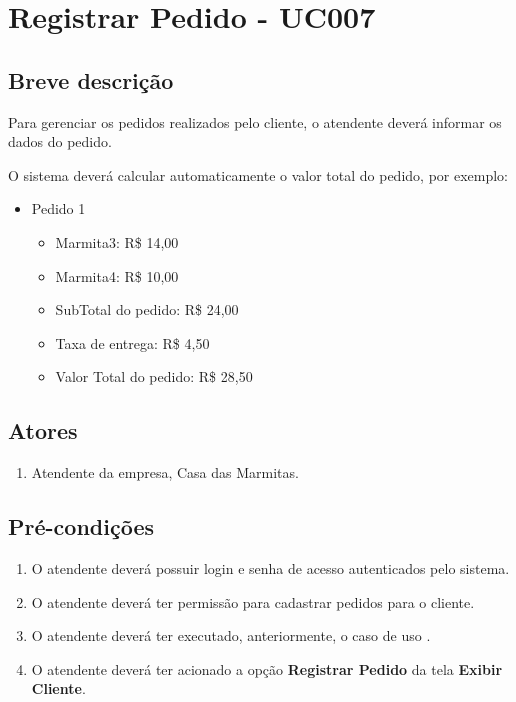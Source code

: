 \chapter{Registrar Pedido - UC007} \label{uc007}

\section{Breve descrição}

Para gerenciar os pedidos realizados pelo cliente, o atendente deverá informar os dados do pedido.

O sistema deverá calcular automaticamente o valor total do pedido, por exemplo:

\begin{itemize}
	\item Pedido 1
	\begin{itemize}
		\item Marmita3: R\$ 14,00
		\item Marmita4: R\$ 10,00
		\item SubTotal do pedido: R\$ 24,00
		\item Taxa de entrega: R\$ 4,50
		\item Valor Total do pedido: R\$ 28,50
	\end{itemize}
\end{itemize}

\section{Atores}

\begin{enumerate}
	\item Atendente da empresa, Casa das Marmitas.
\end{enumerate}

\section{Pré-condições}

\begin{enumerate}
	\item O atendente deverá possuir login e senha de acesso autenticados pelo sistema.
	\item O atendente deverá ter permissão para cadastrar pedidos para o cliente.
	\item O atendente deverá ter executado, anteriormente, o caso de uso .
	\item O atendente deverá ter acionado a opção \textbf{Registrar Pedido} da tela \textbf{Exibir Cliente}.
\end{enumerate}

